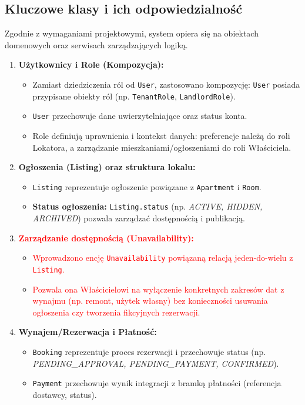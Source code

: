 \documentclass[11pt, a4paper]{article}
\begin{document}
\subsection{Kluczowe klasy i ich odpowiedzialność}
Zgodnie z wymaganiami projektowymi, system opiera się na obiektach domenowych oraz serwisach zarządzających logiką.

\begin{enumerate}
    \item \textbf{Użytkownicy i Role (Kompozycja):}
    \begin{itemize}
        \item Zamiast dziedziczenia ról od \texttt{User}, zastosowano kompozycję: \texttt{User} posiada przypisane obiekty ról (np. \texttt{TenantRole}, \texttt{LandlordRole}).
        \item \texttt{User} przechowuje dane uwierzytelniające oraz status konta.
        \item Role definiują uprawnienia i kontekst danych: preferencje należą do roli Lokatora, a zarządzanie mieszkaniami/ogłoszeniami do roli Właściciela.
    \end{itemize}

    \item \textbf{Ogłoszenia (Listing) oraz struktura lokalu:}
    \begin{itemize}
        \item \texttt{Listing} reprezentuje ogłoszenie powiązane z \texttt{Apartment} i \texttt{Room}.
        \item \textbf{Status ogłoszenia:} \texttt{Listing.status} (np. \textit{ACTIVE, HIDDEN, ARCHIVED}) pozwala zarządzać dostępnością i publikacją.
    \end{itemize}

    \item \textcolor{red}{\textbf{Zarządzanie dostępnością (Unavailability):}}
    \begin{itemize}
        \item \textcolor{red}{Wprowadzono encję \texttt{Unavailability} powiązaną relacją jeden-do-wielu z \texttt{Listing}.}
        \item \textcolor{red}{Pozwala ona Właścicielowi na wyłączenie konkretnych zakresów dat z wynajmu (np. remont, użytek własny) bez konieczności usuwania ogłoszenia czy tworzenia fikcyjnych rezerwacji.}
    \end{itemize}

    \item \textbf{Wynajem/Rezerwacja i Płatność:}
    \begin{itemize}
        \item \texttt{Booking} reprezentuje proces rezerwacji i przechowuje status (np. \textit{PENDING\_APPROVAL, PENDING\_PAYMENT, CONFIRMED}).
        \item \texttt{Payment} przechowuje wynik integracji z bramką płatności (referencja dostawcy, status).
    \end{itemize}
\end{enumerate}
\end{document}
